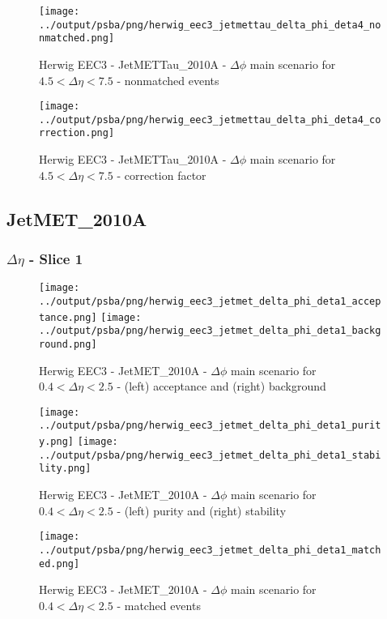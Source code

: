 \documentclass[11pt]{book}
\begin{document}
\begin{figure}[ht]
\centering
\texttt{[image: ../output/psba/png/herwig\_eec3\_jetmettau\_delta\_phi\_deta4\_nonmatched.png]}
\caption{Herwig EEC3 - JetMETTau\_2010A - $\Delta\phi$ main scenario for $4.5 < \Delta\eta < 7.5$ - nonmatched events}
\label{fig:hw_eec3_jetmettau_delta_phi_deta4_nonmatched}
\end{figure}

\begin{figure}[ht]
\centering
\texttt{[image: ../output/psba/png/herwig\_eec3\_jetmettau\_delta\_phi\_deta4\_correction.png]}
\caption{Herwig EEC3 - JetMETTau\_2010A - $\Delta\phi$ main scenario for $4.5 < \Delta\eta < 7.5$ - correction factor}
\label{fig:hw_eec3_jetmettau_delta_phi_deta4_correction}
\end{figure}


\clearpage
\subsection{JetMET\_2010A}

\subsubsection{$\Delta\eta$ - Slice 1}
\begin{figure}[ht]
\centering
\texttt{[image: ../output/psba/png/herwig\_eec3\_jetmet\_delta\_phi\_deta1\_acceptance.png]}
\texttt{[image: ../output/psba/png/herwig\_eec3\_jetmet\_delta\_phi\_deta1\_background.png]}
\caption{Herwig EEC3 - JetMET\_2010A - $\Delta\phi$ main scenario for $0.4 < \Delta\eta < 2.5$ - (left) acceptance and (right) background}
\label{fig:hw_eec3_jetmet_delta_phi_deta1_ab}
\end{figure}

\begin{figure}[ht]
\centering
\texttt{[image: ../output/psba/png/herwig\_eec3\_jetmet\_delta\_phi\_deta1\_purity.png]}
\texttt{[image: ../output/psba/png/herwig\_eec3\_jetmet\_delta\_phi\_deta1\_stability.png]}
\caption{Herwig EEC3 - JetMET\_2010A - $\Delta\phi$ main scenario for $0.4 < \Delta\eta < 2.5$ - (left) purity and (right) stability}
\label{fig:hw_eec3_jetmet_delta_phi_deta1_ps}
\end{figure}

\begin{figure}[ht]
\centering
\texttt{[image: ../output/psba/png/herwig\_eec3\_jetmet\_delta\_phi\_deta1\_matched.png]}
\caption{Herwig EEC3 - JetMET\_2010A - $\Delta\phi$ main scenario for $0.4 < \Delta\eta < 2.5$ - matched events}
\label{fig:hw_eec3_jetmet_delta_phi_deta1_matched}
\end{figure}
\end{document}
